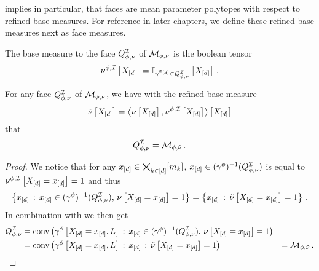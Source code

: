  implies in particular, that faces are mean parameter polytopes with respect to refined base measures.
For reference in later chapters, we define these refined base measures next as face measures.

\begin{definition}
    \label{def:faceMeasure}
    The base measure to the face $Q^{\mathcal{I}}_{\phi,\nu}$ of $\mathcal{M}_{\phi,\nu}$ is the boolean tensor
    \begin{align*}
        \nu^{\phi,\mathcal{I}}\left[X_{[d]}\right]
        = \mathbb{I}_{\gamma^{x_{[d]}}\in Q^{\mathcal{I}}_{\phi,\nu}}\left[X_{[d]}\right] \, .
    \end{align*}
\end{definition}

%
\begin{theorem}\label{the:faceAsRefinedPolytope}
    For any face $Q^{\mathcal{I}}_{\phi,\nu}$ of $\mathcal{M}_{\phi,\nu}$, we have with the refined base measure
    \begin{align*}
        \tilde{\nu}\left[X_{[d]}\right] = \left\langle \nu\left[X_{[d]}\right],\nu^{\phi,\mathcal{I}}\left[X_{[d]}\right]\right\rangle \left[ X_{[d]} \right]
    \end{align*}
    that
    \begin{align*}
        Q^{\mathcal{I}}_{\phi,\nu} = \mathcal{M}_{\phi,\tilde{\nu}} \, .
    \end{align*}
\end{theorem}
\begin{proof}
    We notice that for any $x_{[d]}\in\bigtimes_{k\in[d]}[m_{k}]$, $x_{[d]}\in(\gamma^{\phi})^{-1}(Q^{\mathcal{I}}_{\phi,\nu})$ is equal to $\nu^{\phi,\mathcal{I}}\left[X_{[d]}=x_{[d]}\right]=1$ and thus
    \begin{align*}
        \left\{x_{[d]}\,:\,x_{[d]}\in(\gamma^{\phi})^{-1}(Q^{\mathcal{I}}_{\phi,\nu}),\,\nu\left[X_{[d]}=x_{[d]}\right]=1\right\}
        = \left\{x_{[d]}\,:\,\tilde{\nu}\left[X_{[d]}=x_{[d]}\right]=1\right\} \, .
    \end{align*}
    In combination with  we then get
    \begin{align*}
        Q^{\mathcal{I}}_{\phi,\nu}
        &= \mathrm{conv}\left(\gamma^{\phi}\left[X_{[d]}=x_{[d]},L\right]\,:\,x_{[d]}\in(\gamma^{\phi})^{-1}(Q^{\mathcal{I}}_{\phi,\nu}),\,\nu\left[X_{[d]}=x_{[d]}\right]=1\right) \\
        &= \mathrm{conv}\left(\gamma^{\phi}\left[X_{[d]}=x_{[d]},L\right]\,:\,x_{[d]}\,:\,\tilde{\nu}\left[X_{[d]}=x_{[d]}\right]=1\right)
        &= \mathcal{M}_{\phi,\tilde{\nu}}
        \, .
    \end{align*}
\end{proof}

